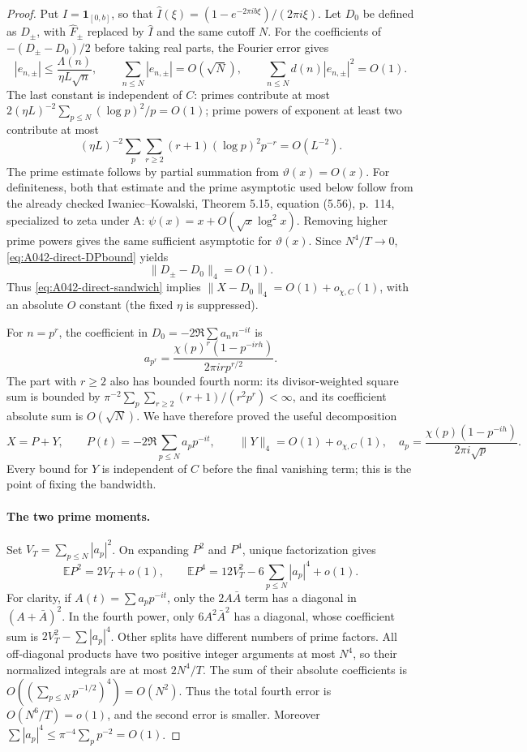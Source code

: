 \begin{proof}
Put $I=\mathbf1_{[0,b]}$, so that
$\widehat I(\xi)=(1-e^{-2\pi ib\xi})/(2\pi i\xi)$.
Let $D_0$ be defined as $D_\pm$, with $\widehat F_\pm$
replaced by $\widehat I$ and the same cutoff $N$.
For the coefficients of $-(D_\pm-D_0)/2$ before taking real
parts, the Fourier error gives
\[
 |e_{n,\pm}|\le\frac{\Lambda(n)}{\eta L\sqrt n},
 \qquad \sum_{n\le N}|e_{n,\pm}|=O(\sqrt N),
 \qquad \sum_{n\le N}d(n)|e_{n,\pm}|^2=O(1).
\]
The last constant is independent of $C$: primes contribute at
most $2(\eta L)^{-2}\sum_{p\le N}(\log p)^2/p=O(1)$;
prime powers of exponent at least two contribute at most
\[
 (\eta L)^{-2}\sum_p\sum_{r\ge2}
                (r+1)(\log p)^2p^{-r}=O(L^{-2}).
\]
The prime estimate follows by partial summation from
$\vartheta(x)=O(x)$. For definiteness, both that estimate and
the prime asymptotic used below follow from the already checked
Iwaniec--Kowalski, Theorem 5.15, equation (5.56), p.~114,
specialized to zeta under A: $\psi(x)=x+O(\sqrt x\log^2x)$.
Removing higher prime powers gives the same sufficient
asymptotic for $\vartheta(x)$.
Since $N^4/T\to0$, \eqref{eq:A042-direct-DPbound} yields
\[
                         \|D_\pm-D_0\|_4=O(1).
\]
Thus \eqref{eq:A042-direct-sandwich} implies
$\|X-D_0\|_4=O(1)+o_{\chi,C}(1)$, with an absolute $O$
constant (the fixed $\eta$ is suppressed).

For $n=p^r$, the coefficient in $D_0=-2\Re\sum a_n n^{-it}$ is
\[
 a_{p^r}=\frac{\chi(p)^r(1-p^{-irh})}{2\pi i r p^{r/2}}.
\]
The part with $r\ge2$ also has bounded fourth norm:
its divisor-weighted square sum is bounded by
$\pi^{-2}\sum_p\sum_{r\ge2}(r+1)/(r^2p^r)<\infty$,
and its coefficient absolute sum is $O(\sqrt N)$.
We have therefore proved the useful decomposition
\begin{equation}\label{eq:A042-direct-decomposition}
 X=P+Y,\qquad
 P(t)=-2\Re\sum_{p\le N}a_p p^{-it},\qquad
 \|Y\|_4=O(1)+o_{\chi,C}(1),
 \quad a_p=\frac{\chi(p)(1-p^{-ih})}{2\pi i\sqrt p}.
\end{equation}
Every bound for $Y$ is independent of $C$ before the final
vanishing term; this is the point of fixing the bandwidth.

\paragraph{The two prime moments.}
Set $V_T=\sum_{p\le N}|a_p|^2$.
On expanding $P^2$ and $P^4$, unique factorization gives
\begin{equation}\label{eq:A042-direct-prime-diag}
 \mathbb EP^2=2V_T+o(1),\qquad
 \mathbb EP^4=12V_T^2-6\sum_{p\le N}|a_p|^4+o(1).
\end{equation}
For clarity, if $A(t)=\sum a_p p^{-it}$, only the
$2A\bar A$ term has a diagonal in $(A+\bar A)^2$.
In the fourth power, only $6A^2\bar A^2$ has a diagonal,
whose coefficient sum is $2V_T^2-\sum|a_p|^4$.
Other splits have different numbers of prime factors.
All off-diagonal products have two positive integer arguments
at most $N^4$, so their normalized integrals are at most
$2N^4/T$. The sum of their absolute coefficients is
$O((\sum_{p\le N}p^{-1/2})^4)=O(N^2)$.
Thus the total fourth error is $O(N^6/T)=o(1)$, and the
second error is smaller. Moreover
$\sum|a_p|^4\le\pi^{-4}\sum_p p^{-2}=O(1)$.


\end{proof}
